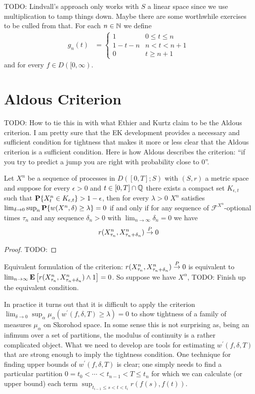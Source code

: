 TODO: Lindvall's approach only works with $S$ a linear space since we use multiplication to tamp things down.  Maybe there are some worthwhile exercises to be culled from that.
For each $n \in \mathbb{N}$ we define 
\begin{align*}
g_n(t) &= \begin{cases}
1 & 0 \leq t \leq n \\
1 - t - n & n < t < n + 1 \\
0 & t \geq n+1
\end{cases}
\end{align*}
and for every $f \in D([0,\infty)$.

\section{Aldous Criterion}

TODO: How to tie this in with what Ethier and Kurtz claim to be the Aldous criterion.  I am pretty sure that the EK development provides a necessary and sufficient condition for tightness that makes it more or less clear that the Aldous criterion is a sufficient condition.
Here is how Aldous describes the criterion: ``if you try to predict a jump you are right with probability close to 0''.
\begin{thm}Let $X^n$ be a sequence of processes in $D([0,T];S)$ with $(S,r)$ a metric space and suppose for every $\epsilon > 0$ and $t \in [0,T] \cap \mathbb{Q}$ there exists a compact set $K_{\epsilon,t}$ such that $\textbf{P}\{X^n_t \in K_{\epsilon,t}\} > 1 - \epsilon$, then for every $\lambda > 0$ $X^n$ satisfies $\lim_{\delta \to 0} \sup_n \textbf{P}\{w(X^n, \delta) \geq \lambda\} =0$ if and only if for any sequence of $\mathcal{F}^{X^n}$-optional times $\tau_n$ and any sequence $\delta_n > 0$ with $\lim_{n \to \infty} \delta_n =0$ we have
\begin{align*}
r(X^n_{\tau_n}, X^n_{\tau_n + \delta_n}) \overset{P}\to 0
\end{align*}
\end{thm}
\begin{proof}
TODO:
\end{proof}

Equivalent formulation of the criterion: $r(X^n_{\tau_n}, X^n_{\tau_n + \delta_n}) \overset{P}\to 0$ is equivalent to $\lim_{n \to \infty} \textbf{E}\left[r(X^n_{\tau_n}, X^n_{\tau_n + \delta_n}) \wedge 1\right] = 0$.  So suppose we have $X^\alpha$,  TODO:  Finish up the equivalent condition.

In practice it turns out that it is difficult to apply the criterion $\lim_{\delta \to 0} \sup_{\alpha} \mu_\alpha( w^\prime(f, \delta, T) \geq \lambda) = 0$ to show tightness of a family of
measures $\mu_\alpha$ on Skorohod space.  In some sense this is not surprising as, being an infimum over a set of partitions, the modulus of continuity is a rather complicated object.  What we need to develop are tools for estimating $w^\prime(f, \delta, T)$ that are strong enough to imply the tightness condition.  One technique for finding upper bounds of $w^\prime(f, \delta, T)$ is clear; one simply needs to find a particular partition $0=t_0 < \dotsb < t_{n-1} < T \leq t_n$ for which we can calculate (or upper bound) each term
$\sup_{t_{i-1} \leq s < t < t_i} r(f(s), f(t))$.  

